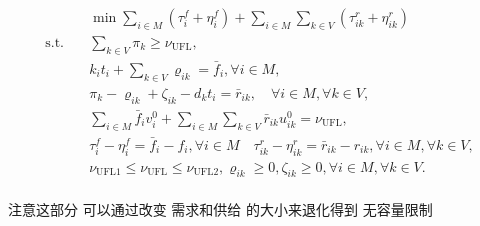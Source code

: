 \documentclass[UTF8]{article}
\begin{document}
\begin{equation}
\begin{aligned}
&\min \sum_{i \in M} \left(\tau_{i}^{f}+\eta_{i}^{f}\right)+\sum_{i \in M} \sum_{k \in V} \left(\tau_{i k}^r+\eta_{i k}^{r}\right) \\
\text{s.t.} \quad &\sum_{k \in V} \pi_{k} \geq \nu_{\mathrm{UFL}}, \\
&k_it_i+\sum_{k \in V} \varrho_{i k}=\bar{f}_{i}, \forall i \in M, \\
&\pi_{k}-\varrho_{i k}+\zeta_{i k}-d_kt_i=\bar{r}_{i k}, \quad \forall i \in M, \forall k \in V, \\
&\sum_{i \in M} \bar{f}_{i} v_{i}^{0}+\sum_{i \in M} \sum_{k \in V} \bar{r}_{i k} u_{i k}^{0}=\nu_{\mathrm{UFL}}, \\
& \tau_{i}^{f}-\eta_{i}^{f}=\bar{f}_{i}-f_{i}, \forall i \in M \quad \tau_{i k}^{r}-\eta_{i k}^{r}=\bar{r}_{i k}-r_{i k}, \forall i \in M, \forall k \in V, \\
&\nu_{\mathrm{UFL} 1} \leq \nu_{\mathrm{UFL}} \leq \nu_{\mathrm{UFL} 2}, \varrho_{i k} \geq 0, \zeta_{i k} \geq 0, \forall i \in M, \forall k \in V. \\
\end{aligned}
\end{equation}






注意这部分 可以通过改变 需求和供给 的大小来退化得到 无容量限制
\end{document}
